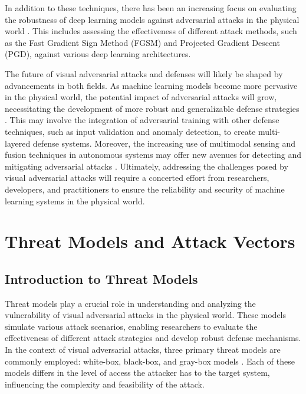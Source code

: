 \documentclass[11pt,a4paper]{article}
\begin{document}
In addition to these techniques, there has been an increasing focus on evaluating the robustness of deep learning models against adversarial attacks in the physical world \cite{doi:10.3390/bdcc8010008}. This includes assessing the effectiveness of different attack methods, such as the Fast Gradient Sign Method (FGSM) and Projected Gradient Descent (PGD), against various deep learning architectures. 

The future of visual adversarial attacks and defenses will likely be shaped by advancements in both fields. As machine learning models become more pervasive in the physical world, the potential impact of adversarial attacks will grow, necessitating the development of more robust and generalizable defense strategies \cite{doi:10.1016/j.eng.2019.12.012}. This may involve the integration of adversarial training with other defense techniques, such as input validation and anomaly detection, to create multi-layered defense systems. Moreover, the increasing use of multimodal sensing and fusion techniques in autonomous systems may offer new avenues for detecting and mitigating adversarial attacks \cite{doi:10.1109/wacv51458.2022.00144}. Ultimately, addressing the challenges posed by visual adversarial attacks will require a concerted effort from researchers, developers, and practitioners to ensure the reliability and security of machine learning systems in the physical world.


\section{Threat Models and Attack Vectors}



\subsection{Introduction to Threat Models}


Threat models play a crucial role in understanding and analyzing the vulnerability of visual adversarial attacks in the physical world. These models simulate various attack scenarios, enabling researchers to evaluate the effectiveness of different attack strategies and develop robust defense mechanisms. In the context of visual adversarial attacks, three primary threat models are commonly employed: white-box, black-box, and gray-box models \cite{doi:10.1145/3128572.3140444}. Each of these models differs in the level of access the attacker has to the target system, influencing the complexity and feasibility of the attack.
\end{document}
